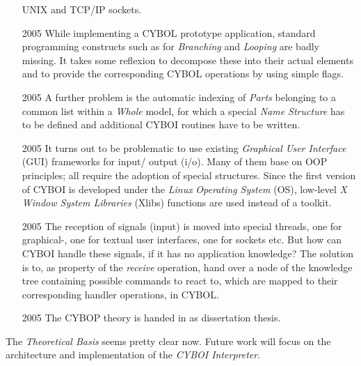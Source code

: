 \begin{itemize}
        UNIX and TCP/IP sockets.
    \item[2005] While implementing a CYBOL prototype application, standard
        programming constructs such as for \emph{Branching} and \emph{Looping}
        are badly missing. It takes some reflexion to decompose these into
        their actual elements and to provide the corresponding CYBOL operations
        by using simple flags.
    \item[2005] A further problem is the automatic indexing of \emph{Parts}
        belonging to a common list within a \emph{Whole} model, for which a
        special \emph{Name Structure} has to be defined and additional CYBOI
        routines have to be written.
    \item[2005] It turns out to be problematic to use existing
        \emph{Graphical User Interface} (GUI) frameworks for input/ output
        (i/o). Many of them base on OOP principles; all require the adoption of
        special structures. Since the first version of CYBOI is developed under
        the \emph{Linux} \emph{Operating System} (OS), low-level
        \emph{X Window System Libraries} (Xlibs) functions are used instead of
        a toolkit.
    \item[2005] The reception of signals (input) is moved into special threads,
        one for graphical-, one for textual user interfaces, one for sockets
        etc. But how can CYBOI handle these signals, if it has no application
        knowledge? The solution is to, as property of the \emph{receive}
        operation, hand over a node of the knowledge tree containing possible
        commands to react to, which are mapped to their corresponding handler
        operations, in CYBOL.
    \item[2005] The CYBOP theory is handed in as dissertation thesis.
\end{itemize}

The \emph{Theoretical Basis} seems pretty clear now. Future work will focus
on the architecture and implementation of the \emph{CYBOI Interpreter}.

